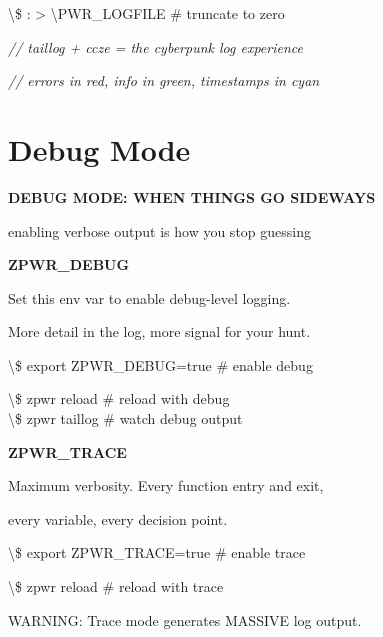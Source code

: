\documentclass[11pt,a4paper,twoside]{book}
\begin{document}
\textbackslash{}\$ : > \textbackslash{}PWR\_LOGFILE            \# truncate to zero

{\small\itshape\color{dimtext} // taillog + ccze = the cyberpunk log experience}

{\small\itshape\color{dimtext} // errors in red, info in green, timestamps in cyan}


\vspace{16pt}

\section{Debug Mode}


\vspace{10pt}
{\large\bfseries\color{neoncyan} DEBUG MODE: WHEN THINGS GO SIDEWAYS}\vspace{6pt}

enabling verbose output is how you stop guessing


\vspace{12pt}
{\bfseries\color{neonyellow} ZPWR\_DEBUG}\vspace{4pt}

Set this env var to enable debug-level logging.

More detail in the log, more signal for your hunt.

\textbackslash{}\$ export ZPWR\_DEBUG=true       \# enable debug

\begin{codebox}
\textbackslash{}\$ zpwr reload                  \# reload with debug\\
\textbackslash{}\$ zpwr taillog                 \# watch debug output\\
\end{codebox}


\vspace{12pt}
{\bfseries\color{neonyellow} ZPWR\_TRACE}\vspace{4pt}

Maximum verbosity. Every function entry and exit,

every variable, every decision point.

\textbackslash{}\$ export ZPWR\_TRACE=true       \# enable trace

\begin{codebox}
\textbackslash{}\$ zpwr reload                  \# reload with trace\\
\end{codebox}

WARNING: Trace mode generates MASSIVE log output.
\end{document}

